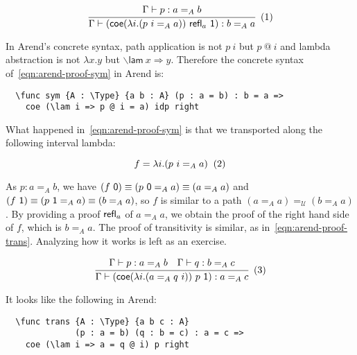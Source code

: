 \[
  \cfrac{
    \Gamma \vdash p : a =_A b
  }{
    \Gamma \vdash (\textsf{coe}
    (\lambda i. (p~i =_A a))~\refl_a~\textsf 1)
    : b =_A a
  }
  \xtag \label{eqn:arend-proof-sym}
\]

In Arend's concrete syntax, path application is not
$p~i$ but $p~@~i$ and lambda abstraction is not $\lambda x.y$ but
$\backslash{}\textsf{lam}~x \Rightarrow y$.
Therefore the concrete syntax of~\ref{eqn:arend-proof-sym} in Arend is:

\begin{verbatim}
  \func sym {A : \Type} {a b : A} (p : a = b) : b = a =>
    coe (\lam i => p @ i = a) idp right
\end{verbatim}

What happened in~\ref{eqn:arend-proof-sym} is that we transported
along the following interval lambda:

\[
  f = \lambda i. (p~i =_A a)
  \xtag
\]

As $p : a =_A b$, we have
$(f~\textsf 0) \equiv (p~\textsf 0 =_A a) \equiv (a =_A a)$ and
$(f~\textsf 1) \equiv (p~\textsf 1 =_A a) \equiv (b =_A a)$,
so $f$ is similar to a path $(a =_A a) =_{\mathcal U} (b =_A a)$.
By providing a proof $\textsf{refl}_a$ of $a =_A a$,
we obtain the proof of the right hand side of $f$, which is $b =_A a$.
The proof of transitivity is similar, as in~\ref{eqn:arend-proof-trans}.
Analyzing how it works is left as an exercise.

\[
  \cfrac{
    \Gamma \vdash p : a =_A b
    \quad
    \Gamma \vdash q : b =_A c
  }{
    \Gamma \vdash (\textsf{coe}
    (\lambda i. (a =_A q~i))~p~\textsf 1)
    : a =_A c
  }
  \xtag \label{eqn:arend-proof-trans}
\]

It looks like the following in Arend:

\begin{verbatim}
  \func trans {A : \Type} {a b c : A}
              (p : a = b) (q : b = c) : a = c =>
    coe (\lam i => a = q @ i) p right
\end{verbatim}